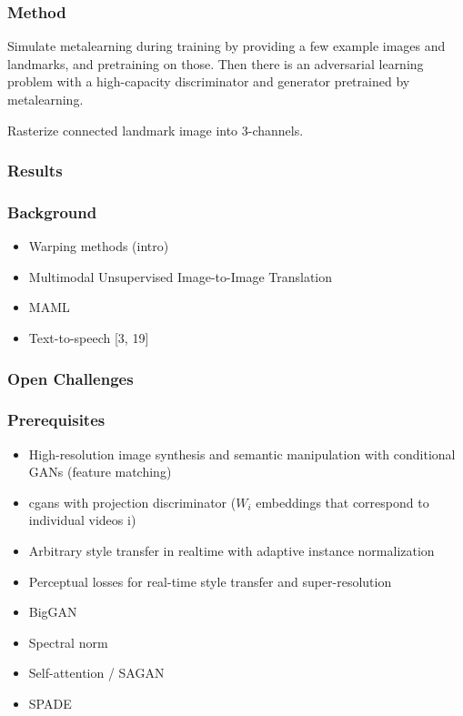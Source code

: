 \documentclass[a4paper, 12pt]{article}
\begin{document}
\subsubsection{Method}

Simulate metalearning during training by providing a few example images and
landmarks, and pretraining on those.
Then there is an adversarial learning problem with a high-capacity
discriminator and generator pretrained by metalearning.

Rasterize connected landmark image into 3-channels.


\subsubsection{Results}


\subsubsection{Background}

\begin{itemize}
        \item Warping methods (intro)
        \item Multimodal Unsupervised Image-to-Image Translation
        \item MAML
        \item Text-to-speech [3, 19]
\end{itemize}


\subsubsection{Open Challenges}


\subsubsection{Prerequisites}

\begin{itemize}
        \item High-resolution image synthesis and semantic manipulation with
                conditional GANs (feature matching)
        \item cgans with projection discriminator ($W_i$ embeddings that correspond to individual videos i)
        \item Arbitrary style transfer in realtime with adaptive instance normalization
        \item Perceptual losses for real-time style transfer and super-resolution
        \item BigGAN
        \item Spectral norm
        \item Self-attention / SAGAN
        \item SPADE
\end{itemize}
\end{document}
